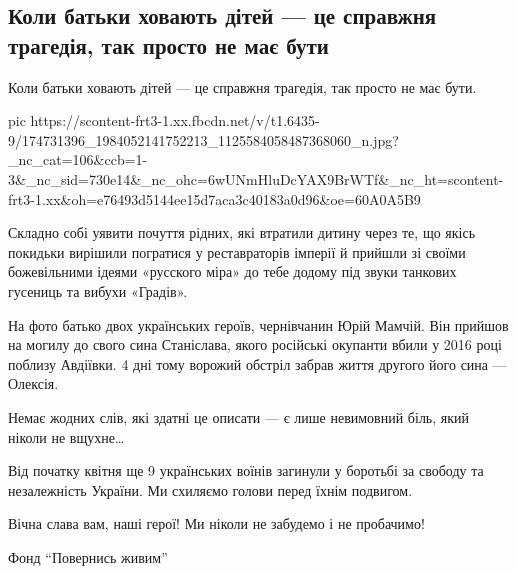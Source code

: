  
 
 
 
 

\subsection{Коли батьки ховають дітей — це справжня трагедія, так просто не має бути}
\label{sec:17_04_2021.fb.backandalive.1.kladbische}

Коли батьки ховають дітей — це справжня трагедія, так просто не має бути. 

\ifcmt
  pic https://scontent-frt3-1.xx.fbcdn.net/v/t1.6435-9/174731396_1984052141752213_1125584058487368060_n.jpg?_nc_cat=106&ccb=1-3&_nc_sid=730e14&_nc_ohc=6wUNmHluDcYAX9BrWTf&_nc_ht=scontent-frt3-1.xx&oh=e76493d5144ee15d7aca3c40183a0d96&oe=60A0A5B9
\fi

Складно собі уявити почуття рідних, які втратили дитину через те, що якісь
покидьки вирішили погратися у реставраторів імперії й прийшли зі своїми
божевільними ідеями «русского міра» до тебе додому під звуки танкових гусениць
та вибухи «Градів». 

На фото батько двох українських героїв, чернівчанин Юрій Мамчій. Він прийшов на
могилу до свого сина Станіслава, якого російські окупанти вбили у 2016 році
поблизу Авдіївки. 4 дні тому ворожий обстріл забрав життя другого його сина —
Олексія. 

Немає жодних слів, які здатні це описати — є лише невимовний біль, який ніколи не вщухне…

Від початку квітня ще 9 українських воїнів загинули у боротьбі за свободу та
незалежність України. Ми схиляємо голови перед їхнім подвигом. 

Вічна слава вам, наші герої! Ми ніколи не забудемо і не пробачимо!

Фонд \enquote{Повернись живим}
